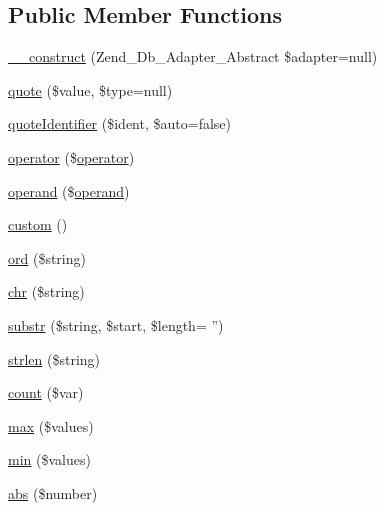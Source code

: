 \subsection*{\-Public \-Member \-Functions}
\begin{DoxyCompactItemize}
\item 
\hyperlink{class_p_h_p_linq___adapter___abstract_a7cdb7dff8375c9933c7eb31f1ba39c62}{\-\_\-\-\_\-construct} (\-Zend\-\_\-\-Db\-\_\-\-Adapter\-\_\-\-Abstract \$adapter=null)
\item 
\hyperlink{class_p_h_p_linq___adapter___abstract_a1dacf01d9ea311e15ebdef97a8279c82}{quote} (\$value, \$type=null)
\item 
\hyperlink{class_p_h_p_linq___adapter___abstract_a251c08713c7cc7b6def84fe31aea2141}{quote\-Identifier} (\$ident, \$auto=false)
\item 
\hyperlink{class_p_h_p_linq___adapter___abstract_a2d46ad013d8192e12a2fdd06f3e54bef}{operator} (\$\hyperlink{class_p_h_p_linq___adapter___abstract_a2d46ad013d8192e12a2fdd06f3e54bef}{operator})
\item 
\hyperlink{class_p_h_p_linq___adapter___abstract_a846ca0475c077dfc1f2d1440e8e85221}{operand} (\$\hyperlink{class_p_h_p_linq___adapter___abstract_a846ca0475c077dfc1f2d1440e8e85221}{operand})
\item 
\hyperlink{class_p_h_p_linq___adapter___abstract_a5d2208b453c6ed89e9e478f425f73933}{custom} ()
\item 
\hyperlink{class_p_h_p_linq___adapter___abstract_ab127dddbdf514ba1c1a58f8b631f83bf}{ord} (\$string)
\item 
\hyperlink{class_p_h_p_linq___adapter___abstract_aeb14afa287248695a208190ad8160283}{chr} (\$string)
\item 
\hyperlink{class_p_h_p_linq___adapter___abstract_ae2fa1e5fee5b3980c5050cabf74fcda4}{substr} (\$string, \$start, \$length= '')
\item 
\hyperlink{class_p_h_p_linq___adapter___abstract_aa280f76645efe62221dc1348ebbbbd26}{strlen} (\$string)
\item 
\hyperlink{class_p_h_p_linq___adapter___abstract_a2900b430a45434d72929e5e2fba9fe59}{count} (\$var)
\item 
\hyperlink{class_p_h_p_linq___adapter___abstract_ae9a63c39a9e7d74f968ede7fa61038fe}{max} (\$values)
\item 
\hyperlink{class_p_h_p_linq___adapter___abstract_a5c157a25cc2ce0a8ca5f36e55ef5cae4}{min} (\$values)
\item 
\hyperlink{class_p_h_p_linq___adapter___abstract_a4a456efd0cb4726f5b770d2f859ae573}{abs} (\$number)

\end{DoxyCompactItemize}
